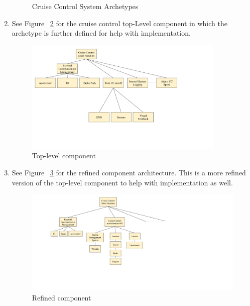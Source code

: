 \documentclass[preprint,11pt,3p]{article}
\begin{document}
\begin{enumerate}
\begin{figure}[H]
					\caption{Cruise Control System Archetypes}
					\label{fig:set}
				\end{figure}
				\newpage
	\item See Figure ~\ref{fig:top} for the cruise control top-Level component in which the archetype is further defined for help with implementation.
		\begin{figure}[H]
			\includegraphics[width=0.9\textwidth]{images/Architecture_Top.png}
			\caption{Top-level component}
			\label{fig:top}
		\end{figure}
	\item See Figure ~\ref{fig:refined} for the refined component architecture. This is a more refined version of the top-level component to help with implementation as well.
		\begin{figure}[H]
			\includegraphics[width=\textwidth]{images/Refined_Components.png}
			\caption{Refined component}
			\label{fig:refined}
		\end{figure}
\end{enumerate}
\end{document}
